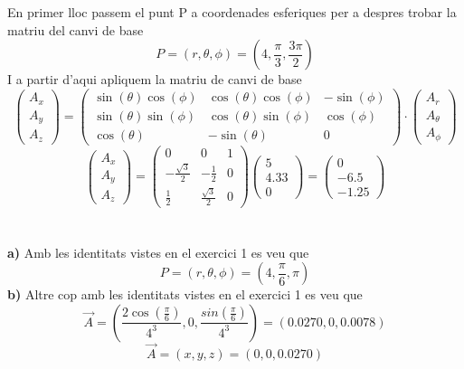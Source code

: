 \documentclass[12pt, a4papre]{article}
\begin{document}
	\section{}
	En primer lloc passem el punt P a coordenades esferiques per a despres trobar la matriu del canvi de base
	\[
		P = (r, \theta, \phi) = (4,\frac{\pi}{3},\frac{3\pi}{2})
	\]
	I a partir d'aqui apliquem la matriu de canvi de base
	\[
		\begin{pmatrix}
			A_x \\
			A_y \\
			A_z
		\end{pmatrix}
		= 
		\begin{pmatrix}
			\sin (\theta)\cos (\phi) 	&  \cos (\theta)\cos (\phi) 	& -\sin(\phi)\\
			\sin (\theta)\sin (\phi) 	& \cos (\theta)\sin (\phi)  	& \cos(\phi)\\ 
			\cos(\theta) 			&-\sin(\theta)			&0
		\end{pmatrix}
		\cdot
		\begin{pmatrix}
			A_r \\
			A_{\theta}\\
			A_{\phi}
		\end{pmatrix}
	\]
	\[
		\begin{pmatrix}
			A_x \\
			A_y \\
			A_z
		\end{pmatrix}
		=
		\begin{pmatrix}
			0				&0				&1	\\
			-\frac{\sqrt{3}}{2}	&-\frac{1}{2}		&0		\\
			\frac{1}{2}			&\frac{\sqrt{3}}{2}	&0
		\end{pmatrix}
		\begin{pmatrix}
			5\\
			4.33\\
			0
		\end{pmatrix}
		=
		\begin{pmatrix}
			0 \\
			-6.5 \\
			-1.25
		\end{pmatrix}
	\]
	\section{}
	\textbf{a)}
	Amb les identitats vistes en el exercici 1 es veu que 
	\[
		P = (r, \theta, \phi) = (4, \frac{\pi}{6}, \pi) 
	\]
	\textbf{b)}
	Altre cop amb les identitats vistes en el exercici 1 es veu que
	\[
		\vec{A} = \left(\frac{2\cos(\frac{\pi}{6})}{4^3}, 0, \frac{sin(\frac{\pi}{6})}{4^3}\right) = (0.0270, 0, 0.0078)
	\]
	\[
		\vec{A} = (x,y,z) = (0,0,0.0270)
	\]
\end{document}
